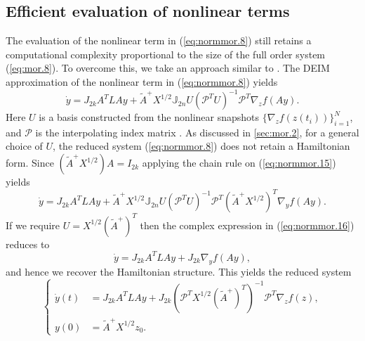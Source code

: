 \subsection{Efficient evaluation of nonlinear terms} \label{sec:normmor.3}
The evaluation of the nonlinear term in (\ref{eq:normmor.8}) still retains a computational complexity proportional to the size of the full order system (\ref{eq:mor.8}). To overcome this, we take an approach similar to . The DEIM approximation of the nonlinear term in (\ref{eq:normmor.8}) yields
\begin{equation} \label{eq:normmor.15}
	\dot y = J_{2k} A^TLAy + \tilde A ^+ X^{1/2} \mathbb J_{2n} U (\mathcal P^TU)^{-1}\mathcal  P^T \nabla_z f(Ay).
\end{equation}
Here $U$ is a basis constructed from the nonlinear snapshots $\{\nabla_z f(z(t_i))\}_{i=1}^N$, and $\mathcal P$ is the interpolating index matrix \cite{Chaturantabut:2010cz}. As discussed in \cref{sec:mor.2}, for a general choice of $U$, the reduced system (\ref{eq:normmor.8}) does not retain a Hamiltonian form. Since $(\tilde A^+ X^{1/2}) A = I_{2k}$ applying the chain rule on (\ref{eq:normmor.15}) yields
\begin{equation} \label{eq:normmor.16}
	\dot y = J_{2k} A^TLAy + \tilde A ^+ X^{1/2} \mathbb J_{2n} U (\mathcal P^TU)^{-1} \mathcal P^T (\tilde A^+ X^{1/2})^T \nabla_y f(Ay).
\end{equation}
If we require $U = X^{1/2} (\tilde A^+)^T$ then the complex expression in (\ref{eq:normmor.16}) reduces to
\begin{equation} \label{eq:normmor.17}
	\dot y = J_{2k} A^TLAy + J_{2k} \nabla_y f(Ay),
\end{equation}
and hence we recover the Hamiltonian structure. This yields the reduced system
\begin{equation} \label{eq:normmor.18}
\left\{
\begin{aligned}
	\dot y(t) &= J_{2k} A^TLAy + J_{2k} (\mathcal P^TX^{1/2} (\tilde A^+)^T)^{-1} \mathcal P^T \nabla_z f(z), \\
	y(0) &= \tilde A^+ X^{1/2} z_0.
\end{aligned}
\right.
\end{equation}
